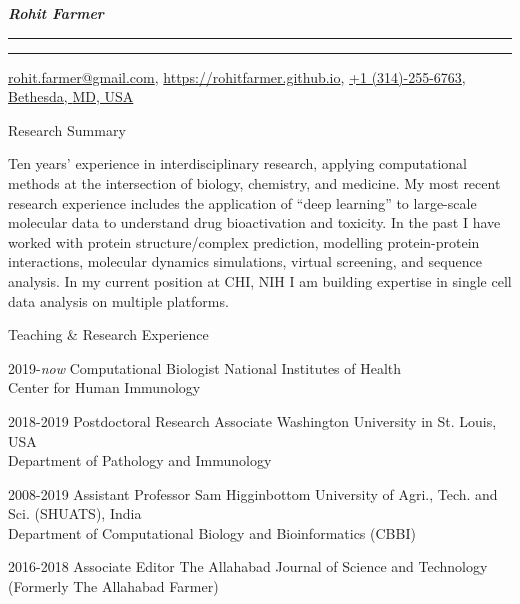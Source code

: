 \documentclass[10pt]{article}
\begin{document}
\settowidth{\cvlabelwidth}{%
\cvlabelfont 2009-2009%
}%
\begin{cv}{\huge \it \bfseries Rohit Farmer}
\vskip3pt
\hrule\hrule
\vskip3pt
\hfill \url{rohit.farmer@gmail.com},  \url{https://rohitfarmer.github.io}, \url{+1 (314)-255-6763}, \url{Bethesda, } \url{MD, USA}

{
\setlength{\cvlabelsep}{0mm}
\setlength{\cvlabelwidth}{0mm}
\begin{cvlist}{Research Summary}
	\item Ten years' experience in interdisciplinary research, applying computational methods at the intersection of biology, chemistry, and medicine. My most recent research experience includes the application of “deep learning” to large-scale molecular data to understand drug bioactivation and toxicity. In the past I have worked with protein structure/complex prediction, modelling protein-protein interactions, molecular dynamics simulations, virtual screening, and sequence analysis. In my current position at CHI, NIH I am building expertise in single cell data analysis on multiple platforms. 
\end{cvlist}
}

\begin{cvlist}{Teaching \& Research Experience}
	\item[2019-\emph{now}] Computational Biologist \hfill National Institutes of Health\\ \hspace*{\fill} Center for Human Immunology
	\item[2018-2019] Postdoctoral Research Associate \hfill Washington University in St. Louis, USA\\  \hspace*{\fill} Department of Pathology and Immunology
	\item[2008-2019] Assistant Professor \hfill Sam Higginbottom University of Agri., Tech. and Sci. (SHUATS), India\\  \hspace*{\fill} Department of Computational Biology and Bioinformatics (CBBI)
	\item[2016-2018] Associate Editor \hfill The Allahabad Journal of Science and Technology \\  \hspace*{\fill} (Formerly The Allahabad Farmer)
\end{cvlist}


\end{cv}
\end{document}
